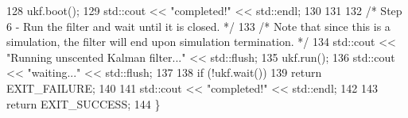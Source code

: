 \begin{DoxyCodeInclude}
128     ukf.boot();
129     std::cout << \textcolor{stringliteral}{"completed!"} << std::endl;
130 
131 
132     \textcolor{comment}{/* Step 6 - Run the filter and wait until it is closed. */}
133     \textcolor{comment}{/* Note that since this is a simulation, the filter will end upon simulation termination. */}
134     std::cout << \textcolor{stringliteral}{"Running unscented Kalman filter..."} << std::flush;
135     ukf.run();
136     std::cout << \textcolor{stringliteral}{"waiting..."} << std::flush;
137 
138     \textcolor{keywordflow}{if} (!ukf.wait())
139         \textcolor{keywordflow}{return} EXIT\_FAILURE;
140 
141     std::cout << \textcolor{stringliteral}{"completed!"} << std::endl;
142 
143     \textcolor{keywordflow}{return} EXIT\_SUCCESS;
144 \}
\end{DoxyCodeInclude}
 